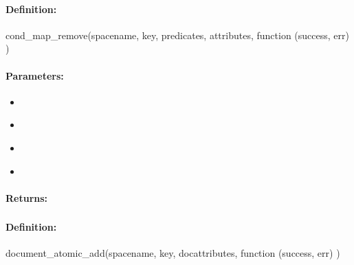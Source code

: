\paragraph{Definition:}
\begin{javascriptcode}
cond_map_remove(spacename, key, predicates, attributes, function (success, err) {})
\end{javascriptcode}
\paragraph{Parameters:}
\begin{itemize}[noitemsep]
\item {}\\

\item {}\\

\item {}\\

\item {}\\

\end{itemize}

\paragraph{Returns:}


\pagebreak
\subsubsection{}
\label{api:nodejs:document_atomic_add}


\paragraph{Definition:}
\begin{javascriptcode}
document_atomic_add(spacename, key, docattributes, function (success, err) {})
\end{javascriptcode}
